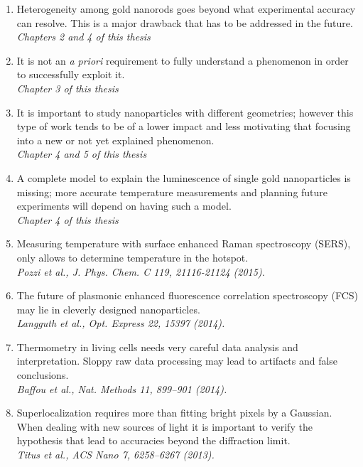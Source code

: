 \documentclass{dissertation}
\begin{document}
\begin{enumerate}

\item Heterogeneity among gold nanorods goes beyond what experimental accuracy
can resolve. This is a major drawback that has to be addressed in the future. \\
\textit{Chapters 2 and 4 of this thesis} 

\item It is not an \textit{a priori} requirement to fully understand a
phenomenon in order to successfully exploit it.
\\
\textit{Chapter 3 of this thesis} 

\item It is important to study nanoparticles with different geometries; however
this type of work tends to be of a lower impact and less motivating that
focusing into a new or not yet explained phenomenon.
\\
\textit{Chapter 4 and 5 of this thesis}

\item A complete model to explain the luminescence of single gold nanoparticles
is missing; more accurate temperature measurements and planning future
experiments will depend on having such a model.
\\
\textit{Chapter 4 of this thesis}

\item Measuring temperature with surface enhanced Raman spectroscopy
(SERS), only allows to determine temperature in the hotspot. \\
\textit{Pozzi et al., J. Phys. Chem. C 119, 21116-21124 (2015).}

\item The future of plasmonic enhanced fluorescence correlation spectroscopy
(FCS) may lie in cleverly designed nanoparticles. \\
\textit{Langguth et al., Opt. Express 22, 15397 (2014).}

\item Thermometry in living cells needs very careful data analysis and
interpretation. Sloppy raw data processing may lead to artifacts and false
conclusions.
\\
\textit{Baffou et al., Nat. Methods 11, 899–901 (2014).}

\item Superlocalization requires more than fitting bright pixels by a
Gaussian. When dealing with new sources of light it is important to verify
the hypothesis that lead to accuracies beyond the diffraction limit.\\
\textit{Titus et al., ACS Nano 7, 6258–6267 (2013).}


\end{enumerate}
\end{document}

